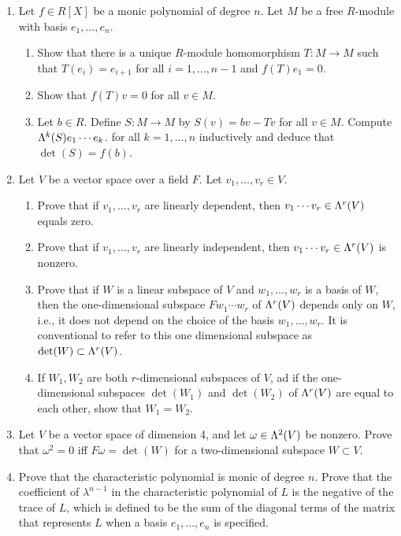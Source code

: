 \documentclass[../psets.tex]{subfiles}
\begin{document}
\begin{enumerate}
\begin{enumerate}
\begin{proof}
            How about the subspace of diagonal matrices?
        \end{proof}
        \item Show that the equality is attained iff $T$ has a cyclic vector.
    \end{enumerate}
    \item Let $f\in R[X]$ be a monic polynomial of degree $n$. Let $M$ be a free $R$-module with basis $e_1,\dots,e_n$.
    \begin{enumerate}
        \item Show that there is a unique $R$-module homomorphism $T:M\to M$ such that $T(e_i)=e_{i+1}$ for all $i=1,\dots,n-1$ and $f(T)e_1=0$.
        \item Show that $f(T)v=0$ for all $v\in M$.
        \item Let $b\in R$. Define $S:M\to M$ by $S(v)=bv-Tv$ for all $v\in M$. Compute $\lam[k]{S}e_1\cdots e_k$. for all $k=1,\dots,n$ inductively and deduce that $\det(S)=f(b)$.
    \end{enumerate}
    \item Let $V$ be a vector space over a field $F$. Let $v_1,\dots,v_r\in V$.
    \begin{enumerate}
        \item Prove that if $v_1,\dots,v_r$ are linearly dependent, then $v_1\cdots v_r\in\lam[r]{V}$ equals zero.
        \item Prove that if $v_1,\dots,v_r$ are linearly independent, then $v_1\cdots v_r\in\lam[r]{V}$ is nonzero.
        \item Prove that if $W$ is a linear subspace of $V$ and $w_1,\dots,w_r$ is a basis of $W$, then the one-dimensional subspace $Fw_1\cdots w_r$ of $\lam[r]{V}$ depends only on $W$, i.e., it does not depend on the choice of the basis $w_1,\dots,w_r$. It is conventional to refer to this one dimensional subspace as $\det(W)\subset\lam[r]{V}$.
        \item If $W_1,W_2$ are both $r$-dimensional subspaces of $V$, ad if the one-dimensional subspaces $\det(W_1)$ and $\det(W_2)$ of $\lam[r]{V}$ are equal to each other, show that $W_1=W_2$.
    \end{enumerate}
    \item Let $V$ be a vector space of dimension 4, and let $\omega\in\lam[2]{V}$ be nonzero. Prove that $\omega^2=0$ iff $F\omega=\det(W)$ for a two-dimensional subspace $W\subset V$.
    \item Prove that the characteristic polynomial is monic of degree $n$. Prove that the coefficient of $\lambda^{n-1}$ in the characteristic polynomial of $L$ is the negative of the trace of $L$, which is defined to be the sum of the diagonal terms of the matrix that represents $L$ when a basis $e_1,\dots,e_n$ is specified.

\end{enumerate}
\end{document}

